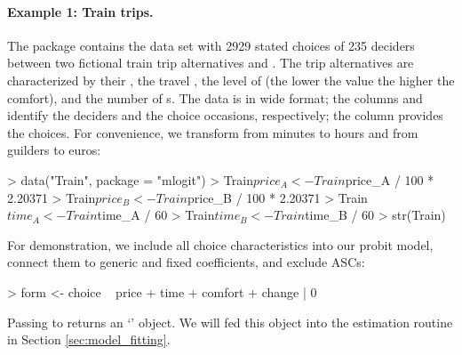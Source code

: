 \documentclass[article,shortnames]{jss}
\newcommand{\class}[1]{`\code{#1}'}
\newcommand{\fct}[1]{\code{#1()}}
\begin{document}
\paragraph{Example 1: Train trips.}

The  package contains the data set  with 2929 stated choices of 235 deciders between two fictional train trip alternatives  and . The trip alternatives are characterized by their , the travel , the level of  (the lower the value the higher the comfort), and the number of s. The data is in wide format; the columns  and  identify the deciders and the choice occasions, respectively; the column  provides the choices. For convenience, we transform  from minutes to hours and  from guilders to euros:

\begin{Schunk}
\begin{Sinput}
> data("Train", package = "mlogit")
> Train$price_A <- Train$price_A / 100 * 2.20371
> Train$price_B <- Train$price_B / 100 * 2.20371
> Train$time_A <- Train$time_A / 60
> Train$time_B <- Train$time_B / 60
> str(Train)
\end{Sinput}
\end{Schunk}

For demonstration, we include all choice characteristics into our probit model, connect them to generic and fixed coefficients, and exclude ASCs:

\begin{Schunk}
\begin{Sinput}
> form <- choice ~ price + time + comfort + change | 0
\end{Sinput}
\end{Schunk}

Passing  to \fct{prepare\_data} returns an \class{RprobitB\_data} object. We will fed this object into the estimation routine \fct{fit\_model} in Section \ref{sec:model_fitting}.
\end{document}
